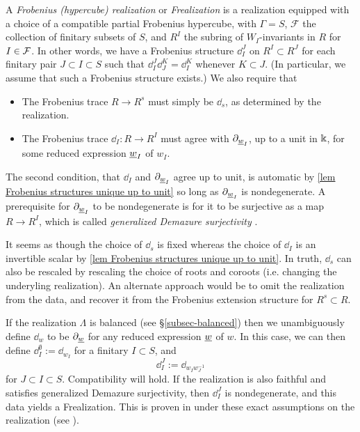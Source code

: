 \begin{defn}\label{defn frobenius hypercube realization} A \emph{Frobenius (hypercube) realization} or \emph{Frealization} is a realization equipped with a choice of a compatible partial Frobenius hypercube, with $\Gamma = S$, $\mathcal{F}$ the collection of finitary subsets of $S$, and $R^I$ the subring of $W_I$-invariants in $R$ for $I\in \mathcal{F}$.
In other words, we have a
Frobenius structure $\dd^J_I$ on $R^I \subset R^J$ for each finitary pair $J \subset I \subset
S$ such that $\dd^J_I \dd^K_J = \dd^K_I$ whenever $K \subset J$.
(In particular, we assume that such a Frobenius structure exists.) 
We also require that 
\begin{itemize}
\item The Frobenius trace $R \to R^s$ must simply be $\dd_s$, as determined by the realization. 
\item The Frobenius trace $\dd_I : R \to R^I$ must agree with $\partial_{\underline{w}_I}$, up to a unit in $\Bbbk$, for some reduced expression $\underline{w}_I$ of $w_I$.
\end{itemize}
\end{defn}

\begin{remark} The second condition, that $\dd_I$ and $\partial_{\underline{w}_I}$ agree up to unit, is automatic by \cref{lem Frobenius structures unique up to unit} so long as $\partial_{\underline{w}_I}$ is nondegenerate. A prerequisite for $\partial_{\underline{w}_I}$ to be nondegenerate is for it to be surjective as a map $R \to R^I$, which is called \emph{generalized Demazure surjectivity} \cite[Definition 3.5]{EKLP}.\end{remark}

\begin{remark} It seems as though the choice of $\dd_s$ is fixed whereas the choice of $\dd_I$ is an invertible scalar by \cref{lem Frobenius structures unique up to unit}. In truth, $\dd_s$ can also be rescaled by rescaling the choice of roots and coroots (i.e. changing the underyling realization). An alternate approach would be to omit the realization from the data, and recover it from the Frobenius extension structure for $R^s \subset R$. \end{remark}

\begin{example}\label{example nice realizations are frobenius}
If the realization $\Lambda$ is balanced (see \S\ref{subsec-balanced}) then we unambiguously define $\dd_w$ to be $\partial_{\underline{w}}$ for any reduced expression $\underline{w}$ of $w$. 
In this case, we can then define $\dd^\emptyset_I:= \dd_{w_I}$ for a finitary $I\subset S$, and 
$$\dd^J_I:=\dd_{w_Iw_J^{-1}}$$
for $J \subset I \subset S$. 
Compatibility will hold. If the realization is also faithful and satisfies generalized Demazure surjectivity, then $\dd^J_I$ is nondegenerate, and this data yields a Frealization. This is proven in \cite[Theorem 4.3]{EKLP} under these exact assumptions on the realization (see \cite[Section 3.1]{EKLP}).
\end{example}


